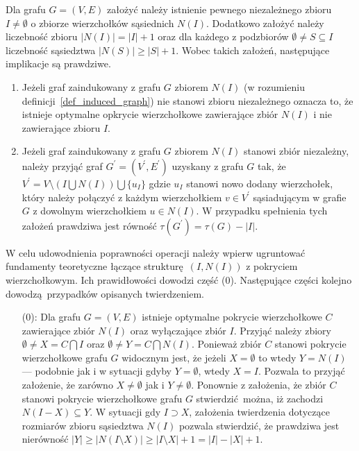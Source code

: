 \par{
  \begin{theorem}
    Dla grafu $G=(V,E)$ założyć należy istnienie pewnego niezależnego zbioru $I\neq \emptyset$ o zbiorze wierzchołków sąsiednich $N(I)$.
    Dodatkowo założyć należy liczebność zbioru $|N(I)|=|I| + 1$ oraz dla każdego z podzbiorów $\emptyset \neq S \subseteq I$ liczebność sąsiedztwa $|N(S)| \geq |S| + 1$.
    Wobec takich założeń, następujące implikacje są prawdziwe.
    \begin{enumerate}
      \item Jeżeli graf zaindukowany z grafu $G$ zbiorem $N(I)$ (w rozumieniu definicji~\ref{def_induced_graph}) nie stanowi zbioru niezależnego oznacza to, że istnieje optymalne opkrycie wierzchołkowe zawierające zbiór $N(I)$ i nie zawierające zbioru $I$.
      \item Jeżeli graf zaindukowany z grafu $G$ zbiorem $N(I)$ stanowi zbiór niezależny, należy przyjąć graf $G^\prime=(V^\prime, E^\prime)$ uzyskany z grafu $G$ tak, że $V^\prime=V \setminus (I \bigcup N(I)) \bigcup \{u_I\}$ gdzie $u_I$ stanowi nowo dodany wierzchołek, który należy połączyć z każdym wierzchołkiem $v \in V^\prime$ sąsiadującym w grafie $G$ z dowolnym wierzchołkiem $u \in N(I)$.
      W przypadku spełnienia tych założeń prawdziwa jest równość $\tau(G^\prime)=\tau(G)-|I|$.
    \end{enumerate}
  \end{theorem}
  \begin{bproof} W celu udowodnienia poprawności operacji należy wpierw ugruntować fundamenty teoretyczne łączące strukturę $(I, N(I))$ z pokryciem wierzchołkowym. Ich prawidłowości dowodzi część (0).
    Następujące części kolejno dowodzą przypadków opisanych twierdzeniem.
    \begin{itemize}
      \item[(0):] Dla grafu $G=(V, E)$ istnieje optymalne pokrycie wierzchołkowe $C$ zawierające zbiór $N(I)$ oraz wyłączające zbiór $I$.
      Przyjąć należy zbiory $\emptyset \neq X=C \bigcap I$ oraz $\emptyset \neq Y=C \bigcap N(I)$.
      Ponieważ zbiór $C$ stanowi pokrycie wierzchołkowe grafu $G$ widocznym jest, że jeżeli $X=\emptyset$ to wtedy $Y=N(I)$ --- podobnie jak i w sytuacji gdyby $Y=\emptyset$, wtedy $X=I$.
      Pozwala to przyjąć założenie, że zarówno $X\neq \emptyset$ jak i $Y\neq \emptyset$.
      Ponownie z założenia, że zbiór $C$ stanowi pokrycie wierzchołkowe grafu $G$ stwierdzić można, iż zachodzi $N(I-X)\subseteq Y$.
      W sytuacji gdy $I \supset X$, założenia twierdzenia dotyczące rozmiarów zbioru sąsiedztwa $N(I)$ pozwala stwierdzić, że prawdziwa jest nierówność $|Y| \geq |N(I \setminus X)| \geq |I \setminus X| + 1 = |I| - |X| + 1$.

\end{itemize}
\end{bproof}}
